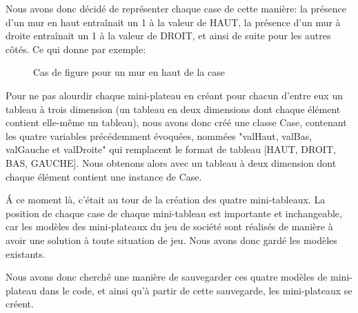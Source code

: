 \documentclass[a4paper, 12pt]{article}
\begin{document}
            Nous avons donc décidé de représenter chaque case de cette manière: la présence d'un mur en haut entraînait un 1 à la valeur de HAUT, la présence d'un mur à droite entraînait un 1 à la valeur de DROIT, et ainsi de suite pour les autres côtés. Ce qui donne par exemple:
            
            \vspace{0.5cm}
            
            \begin{figure}[H]
                \centering
                \caption{Cas de figure pour un mur en haut de la case}
            \end{figure}
            
    
            Pour ne pas alourdir chaque mini-plateau en créant pour chacun d'entre eux un tableau à trois dimension (un tableau en deux dimensions dont chaque élément contient elle-même un tableau), nous avons donc créé une classe Case, contenant les quatre variables précédemment évoquées, nommées "valHaut, valBas, valGauche et valDroite" qui remplacent le format de tableau [HAUT, DROIT, BAS, GAUCHE]. Nous obtenons alors avec un tableau à deux dimension dont chaque élément contient une instance de Case.
            
            Á ce moment là, c'était au tour de la création des quatre mini-tableaux. La position de chaque case de chaque mini-tableau est importante et inchangeable, car les modèles des mini-plateaux du jeu de société sont réalisés de manière à avoir une solution à toute situation de jeu. Nous avons donc gardé les modèles existants. 
            
            Nous avons donc cherché une manière de sauvegarder ces quatre modèles de mini-plateau dans le code, et ainsi qu'à partir de cette sauvegarde, les mini-plateaux se créent. 
            
\end{document}
